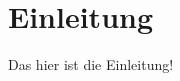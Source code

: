 \documentclass[main.tex]{subfiles}
\begin{document}
\section{Einleitung}

Das hier ist die Einleitung!
\end{document}
